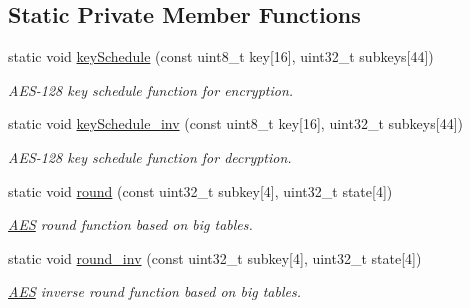 \subsection*{Static Private Member Functions}
\begin{DoxyCompactItemize}
\item 
static void \hyperlink{classAES_a5e97a2e938d742904ec586750f0d552b}{key\+Schedule} (const uint8\+\_\+t key\mbox{[}16\mbox{]}, uint32\+\_\+t subkeys\mbox{[}44\mbox{]})
\begin{DoxyCompactList}\small\item\em A\+E\+S-\/128 key schedule function for encryption. \end{DoxyCompactList}\item 
static void \hyperlink{classAES_acea7e3cbb7a3f72726be709079161818}{key\+Schedule\+\_\+inv} (const uint8\+\_\+t key\mbox{[}16\mbox{]}, uint32\+\_\+t subkeys\mbox{[}44\mbox{]})
\begin{DoxyCompactList}\small\item\em A\+E\+S-\/128 key schedule function for decryption. \end{DoxyCompactList}\item 
\hypertarget{classAES_ae358f41a16562f7084b748f08239ed22}{}static void \hyperlink{classAES_ae358f41a16562f7084b748f08239ed22}{round} (const uint32\+\_\+t subkey\mbox{[}4\mbox{]}, uint32\+\_\+t state\mbox{[}4\mbox{]})\label{classAES_ae358f41a16562f7084b748f08239ed22}

\begin{DoxyCompactList}\small\item\em \hyperlink{classAES}{A\+E\+S} round function based on big tables. \end{DoxyCompactList}\item 
\hypertarget{classAES_a6ab65fb31bcd5585d9a52f92d0efe731}{}static void \hyperlink{classAES_a6ab65fb31bcd5585d9a52f92d0efe731}{round\+\_\+inv} (const uint32\+\_\+t subkey\mbox{[}4\mbox{]}, uint32\+\_\+t state\mbox{[}4\mbox{]})\label{classAES_a6ab65fb31bcd5585d9a52f92d0efe731}

\begin{DoxyCompactList}\small\item\em \hyperlink{classAES}{A\+E\+S} inverse round function based on big tables. \end{DoxyCompactList}\end{DoxyCompactItemize}
